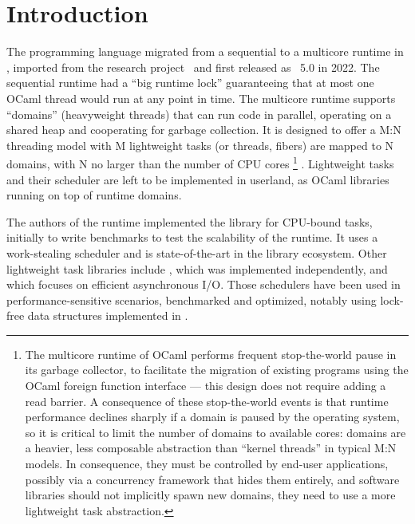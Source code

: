 
\section{Introduction}

The \OCaml programming language migrated from a sequential to a multicore runtime in \OCamlFive, imported from the \MulticoreOCaml research project~\citep{DBLP:journals/pacmpl/Sivaramakrishnan20} and first released as \OCaml~5.0 in 2022.
The sequential runtime had a ``big runtime lock'' guaranteeing that at most one OCaml thread would run at any point in time.
The multicore runtime supports ``domains'' (heavyweight threads) that can run \OCaml code in parallel, operating on a shared heap and cooperating for garbage collection.
It is designed to offer a M:N threading model with M lightweight tasks (or threads, fibers) are mapped to N domains, with N no larger than the number of CPU cores%
\footnote{
The multicore runtime of OCaml performs frequent stop-the-world pause in its garbage collector, to facilitate the migration of existing programs using the OCaml foreign function interface --- this design does not require adding a read barrier. A consequence of these stop-the-world events is that runtime performance declines sharply if a domain is paused by the operating system, so it is critical to limit the number of domains to available cores: domains are a heavier, less composable abstraction than ``kernel threads'' in typical M:N models. In consequence, they must be controlled by end-user applications, possibly via a concurrency framework that hides them entirely, and software libraries should not implicitly spawn new domains, they need to use a more lightweight task abstraction.
}%
.
Lightweight tasks and their scheduler are left to be implemented in userland, as OCaml libraries running on top of runtime domains.

The authors of the \MulticoreOCaml runtime implemented the \Domainslib library for CPU-bound tasks, initially to write benchmarks to test the scalability of the \OCaml runtime.
It uses a work-stealing scheduler and is state-of-the-art in the \OCaml library ecosystem.
Other lightweight task libraries include \Moonpool, which was implemented independently, and \Eio which focuses on efficient asynchronous I/O.
Those schedulers have been used in performance-sensitive scenarios, benchmarked and optimized, notably using lock-free data structures implemented in \OCamlFive.

